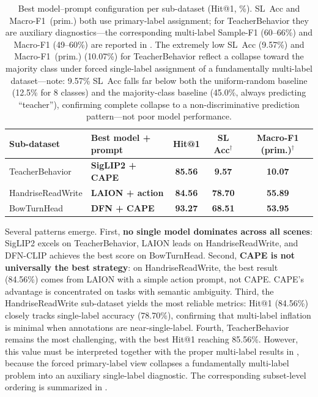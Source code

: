 \documentclass[electronics,article,submit,pdftex,moreauthors]{Definitions/mdpi}
\begin{document}
\begin{table}[H]
\caption{Best model--prompt configuration per sub-dataset (Hit@1, \%). SL~Acc and Macro-F1~(prim.) both use primary-label assignment; for TeacherBehavior they are auxiliary diagnostics---the corresponding multi-label Sample-F1 (60--66\%) and Macro-F1 (49--60\%) are reported in . The extremely low SL~Acc (9.57\%) and Macro-F1~(prim.) (10.07\%) for TeacherBehavior reflect a collapse toward the majority class under forced single-label assignment of a fundamentally multi-label dataset---note: 9.57\% SL~Acc falls far below both the uniform-random baseline (12.5\% for 8 classes) and the majority-class baseline (45.0\%, always predicting ``teacher''), confirming complete collapse to a non-discriminative prediction pattern---not poor model performance.}
\label{tab:best_per_dataset}
\centering
\small
\begin{tabular}{llccc}
\toprule
\textbf{Sub-dataset} & \textbf{Best model + prompt} & \textbf{Hit@1} & \textbf{SL Acc$^{\dagger}$} & \textbf{Macro-F1 (prim.)$^{\dagger}$} \\
\midrule
TeacherBehavior & \textbf{SigLIP2 + CAPE} & \textbf{85.56} & \textbf{9.57} & \textbf{10.07} \\
HandriseReadWrite & \textbf{LAION + action} & \textbf{84.56} & \textbf{78.70} & \textbf{55.89} \\
BowTurnHead & \textbf{DFN + CAPE} & \textbf{93.27} & \textbf{68.51} & \textbf{53.95} \\
\bottomrule
\end{tabular}
\end{table}

Several patterns emerge.
First, \textbf{no single model dominates across all scenes}: SigLIP2 excels on TeacherBehavior, LAION leads on HandriseReadWrite, and DFN-CLIP achieves the best score on BowTurnHead.
Second, \textbf{CAPE is not universally the best strategy}: on HandriseReadWrite, the best result (84.56\%) comes from LAION with a simple action prompt, not CAPE. CAPE's advantage is concentrated on tasks with semantic ambiguity.
Third, the HandriseReadWrite sub-dataset yields the most reliable metrics: Hit@1 (84.56\%) closely tracks single-label accuracy (78.70\%), confirming that multi-label inflation is minimal when annotations are near-single-label.
Fourth, TeacherBehavior remains the most challenging, with the best Hit@1 reaching 85.56\%. However, this value must be interpreted together with the proper multi-label results in , because the forced primary-label view collapses a fundamentally multi-label problem into an auxiliary single-label diagnostic.
The corresponding subset-level ordering is summarized in .
\end{document}
